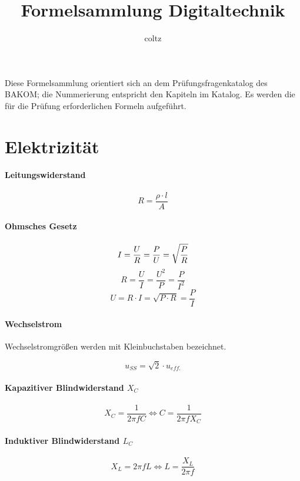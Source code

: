 \documentclass[10pt,landscape]{scrartcl}
\author{coltz}
\title{Formelsammlung Digitaltechnik}
\begin{document}
\setlength{\columnsep}{1cm}
\begin{multicols}{3}

\noindent
Diese Formelsammlung orientiert sich an dem Prüfungsfragenkatalog des BAKOM;
die Nummerierung entspricht den Kapiteln im Katalog.
Es werden die für die Prüfung erforderlichen Formeln aufgeführt.

\section{Elektrizität}

\noindent
{}

\paragraph{Leitungswiderstand}

$$ R = \frac{\rho \cdot l}{A} $$

\paragraph{Ohmsches Gesetz}

$$ I = \frac{U}{R} = \frac{P}{U} = \sqrt{P \over R} $$
$$ R = \frac{U}{I} = \frac{U^2}{P} = \frac{P}{I^2} $$
$$ U= R \cdot I = \sqrt{P\cdot R} = \frac{P}{I} $$

\paragraph{Wechselstrom} Wechselstromgrößen werden mit Kleinbuchstaben bezeichnet.

$$ u_{SS} = \sqrt{2}\cdot u_{eff.} $$

\paragraph{Kapazitiver Blindwiderstand $X_C$}

$$ X_C =  \frac{1}{2 \pi f C} \Longleftrightarrow C =  \frac{1}{2 \pi f X_C} $$

\paragraph{Induktiver Blindwiderstand $L_C$}

$$ X_L =  2 \pi f L \Longleftrightarrow L =  \frac{X_L}{2 \pi f} $$


\end{multicols}
\end{document}
